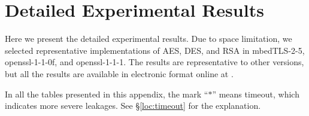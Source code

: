 
  
  
  

\newpage
\section{Detailed Experimental Results}
\label{sec:result-table}

Here we present the detailed experimental results.
Due to space limitation, we selected representative implementations of
AES, DES, and RSA in
mbedTLS-2-5, 
openssl-1-1-0f,  and
openssl-1-1-1.  
The results are representative to other versions, but all the results
are available in electronic format online at .

In all the tables presented in this appendix, the mark
``$*$'' means timeout, which indicates more severe leakages.
See \S\ref{loc:timeout} for the explanation.






